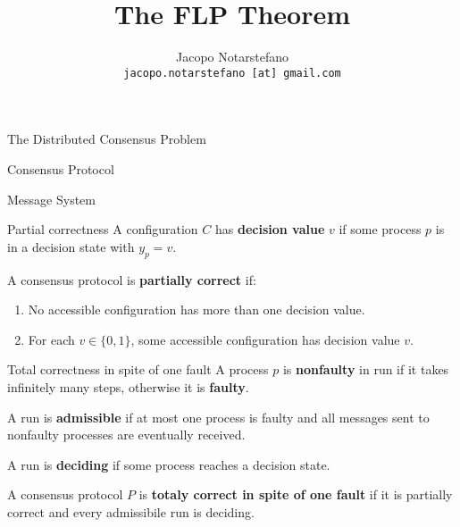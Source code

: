 \documentclass[12pt]{beamer}
\title{The FLP Theorem}
\author[Jacopo Notarstefano]{
  Jacopo Notarstefano\\
  \texttt{jacopo.notarstefano [at] gmail.com}
}
\date{}
\begin{document}
  \begin{frame}[plain]
    \titlepage
  \end{frame}

  \begin{frame}{The Distributed Consensus Problem}
    \begin{definition}{}
    \end{definition}
  \end{frame}

  \begin{frame}{Consensus Protocol}
  \end{frame}

  \begin{frame}{Message System}
  \end{frame}

  \begin{frame}{Partial correctness}
    A configuration \(C\) has \textbf{decision value} \(v\) if some process \(p\) is in a decision state with \(y_p = v\).

    \vspace{0.25cm}

    \begin{definition}
      A consensus protocol is \textbf{partially correct} if:
      \begin{enumerate}
        \item No accessible configuration has more than one decision value.
        \item For each \(v\in \{0,1\}\), some accessible configuration has decision value \(v\).
      \end{enumerate}
    \end{definition}
  \end{frame}

  \begin{frame}{Total correctness in spite of one fault}
    A process \(p\) is \textbf{nonfaulty} in run if it takes infinitely many steps, otherwise it is \textbf{faulty}.

    \vspace{0.25cm}

    A run is \textbf{admissible} if at most one process is faulty and all messages sent to nonfaulty processes are eventually received.

    \vspace{0.25cm}

    A run is \textbf{deciding} if some process reaches a decision state.

    \vspace{0.25cm}

    \begin{definition}
      A consensus protocol \(P\) is \textbf{totaly correct in spite of one fault} if it is partially correct and every admissibile run is deciding.
    \end{definition}
  \end{frame}
\end{document}
